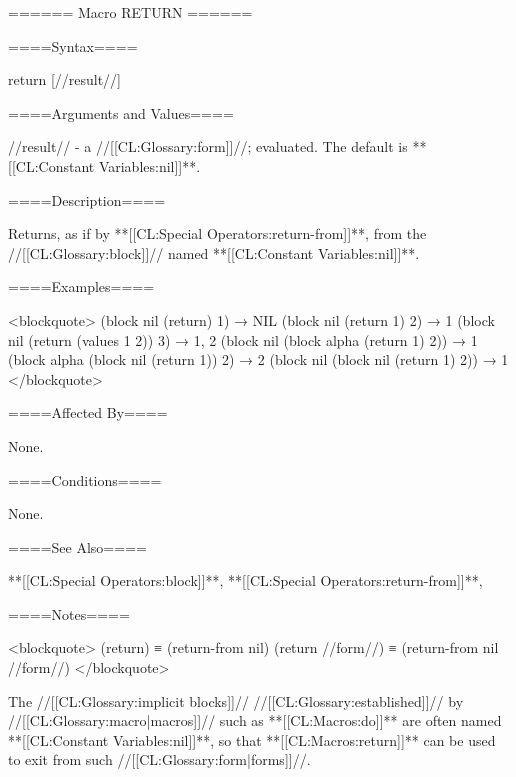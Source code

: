 ====== Macro RETURN ======

====Syntax====

\DefmacNoReturn return {[//result//]}

====Arguments and Values====

//result// - a //[[CL:Glossary:form]]//; evaluated. The default is **[[CL:Constant Variables:nil]]**.

====Description====

Returns, as if by **[[CL:Special Operators:return-from]]**, from the //[[CL:Glossary:block]]// named **[[CL:Constant Variables:nil]]**.

====Examples====

<blockquote> (block nil (return) 1) → NIL (block nil (return 1) 2) → 1 (block nil (return (values 1 2)) 3) → 1, 2 (block nil (block alpha (return 1) 2)) → 1 (block alpha (block nil (return 1)) 2) → 2 (block nil (block nil (return 1) 2)) → 1 </blockquote>

====Affected By====

None.

====Conditions====

None.

====See Also====

**[[CL:Special Operators:block]]**, **[[CL:Special Operators:return-from]]**, {\secref\Evaluation}

====Notes====

<blockquote> (return) ≡ (return-from nil) (return //form//) ≡ (return-from nil //form//) </blockquote>

The //[[CL:Glossary:implicit blocks]]// //[[CL:Glossary:established]]// by //[[CL:Glossary:macro|macros]]// such as **[[CL:Macros:do]]** are often named **[[CL:Constant Variables:nil]]**, so that **[[CL:Macros:return]]** can be used to exit from such //[[CL:Glossary:form|forms]]//.

